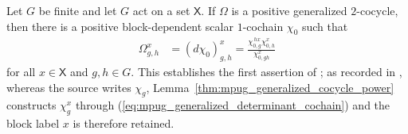 \begin{lemma}
    \label{thm:mpug_positive_generalized_cocycle}
    \leanok
    Let $G$ be finite and let $G$ act on a set $\mathsf X$. If $\Omega$ is a
    positive generalized $2$-cocycle, then there is a positive
    block-dependent scalar $1$-cochain $\chi_0$ such that
    \begin{align}
        \Omega^x_{g,h}
         & =(d\chi_0)^x_{g,h}
        =\frac{\chi^{\,h x}_{0,g}\chi^x_{0,h}}
        {\chi^x_{0,gh}}
        \label{eq:mpug_positive_coboundary}
    \end{align}
    for all $x\in\mathsf X$ and $g,h\in G$.
    This establishes the first assertion of
    \cite[Corollary at lines~5950--5960]{FrancoRubio2025MPUGauging}; as
    recorded in \cite{gap:fbc25_positive_generalized_cocycle_block_index},
    whereas the source writes $\chi_g$,
    Lemma~\ref{thm:mpug_generalized_cocycle_power} constructs $\chi^x_g$
    through (\ref{eq:mpug_generalized_determinant_cochain}) and the block label
    $x$ is therefore retained.
\end{lemma}

